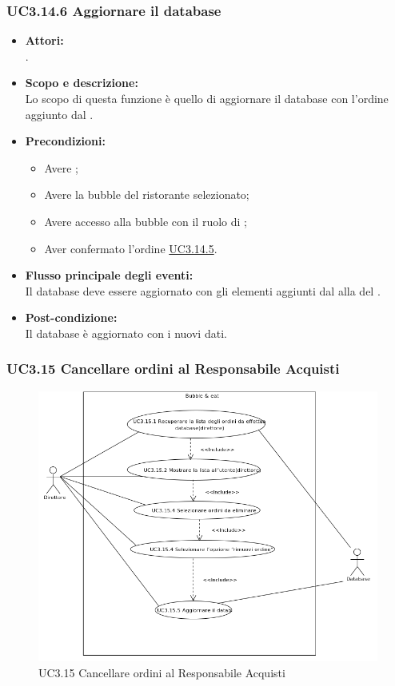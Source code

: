 \subsubsection{UC3.14.6 Aggiornare il database} \label{UC3.14.6}

\begin{itemize}
	\item \textbf{Attori:}
	\\.
	\item \textbf{Scopo e descrizione:} 
	\\Lo scopo di questa funzione è quello di aggiornare il database con l’ordine aggiunto dal .
	\item \textbf{Precondizioni:}
	\begin{itemize}
		\item Avere ;
		\item Avere la bubble del ristorante selezionato;
		\item Avere accesso alla bubble con il ruolo di ;
		\item Aver confermato l’ordine \hyperref[UC3.14.5]{UC3.14.5}.
	\end{itemize}
	\item \textbf{Flusso principale degli eventi:}
	\\Il database deve essere aggiornato con gli elementi aggiunti dal  alla  del .
	\item \textbf{Post-condizione:}
	\\Il database è aggiornato con i nuovi dati.
\end{itemize}

\subsubsection{UC3.15 Cancellare ordini al Responsabile Acquisti} \label{UC3.15}

\begin{figure}[H]
	\centering
	\includegraphics[width=15cm]{../../documenti/AnalisiDeiRequisiti/Diagrammi_img/uc3_15.png}
	\caption{UC3.15 Cancellare ordini al Responsabile Acquisti}
\end{figure}

